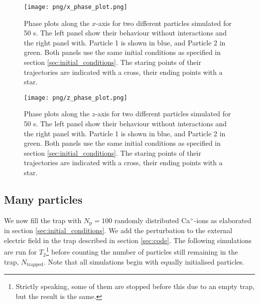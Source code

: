\begin{figure}
    \texttt{[image: png/x\_phase\_plot.png]}
    \caption{Phase plots along the $x$-axis for two different particles simulated for 50 \textmu s. The left panel show their behaviour without interactions and the right panel with. Particle 1 is shown in blue, and Particle 2 in green. Both panels use the same initial conditions as specified in section \ref{sec:initial_conditions}. The staring points of their trajectories are indicated with a cross, their ending points with a star.}
    \label{fig:x_phase_two_particles}
\end{figure} 

\begin{figure}
    \texttt{[image: png/z\_phase\_plot.png]}
    \caption{Phase plots along the $z$-axis for two different particles simulated for 50 \textmu s. The left panel show their behaviour without interactions and the right panel with. Particle 1 is shown in blue, and Particle 2 in green. Both panels use the same initial conditions as specified in section \ref{sec:initial_conditions}. The staring points of their trajectories are indicated with a cross, their ending points with a star.}
    \label{fig:z_phase_two_particles}
\end{figure}
\twocolumngrid





\subsection{Many particles}\label{sec:many_particles}

We now fill the trap with $N_\mathrm{p} = 100$ randomly distributed Ca$^+$-ions as elaborated in section \ref{sec:initial_conditions}. We add the perturbation to the external electric field in the trap described in section \ref{sec:code}. The following simulations are run for $T_2$\footnote{Strictly speaking, some of them are stopped before this due to an empty trap, but the result is the same.} before counting the number of particles still remaining in the trap, $N_\mathrm{trapped}$. Note that all simulations begin with equally initialised particles.

